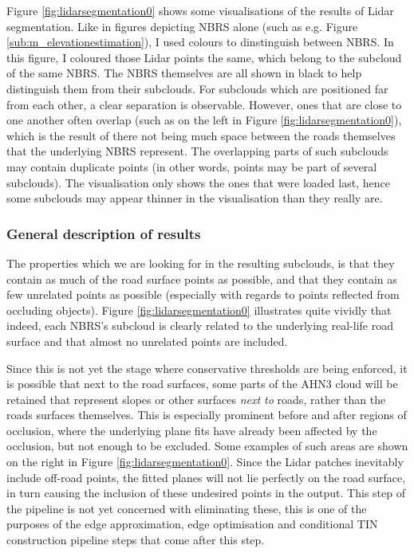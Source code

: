Figure \ref{fig:lidarsegmentation0} shows some visualisations of the results of Lidar segmentation. Like in figures depicting NBRS alone (such as e.g. Figure \ref{sub:m_elevationestimation}), I used colours to dinstinguish between NBRS. In this figure, I coloured those Lidar points the same, which belong to the subcloud of the same NBRS. The NBRS themselves are all shown in black to help distinguish them from their subclouds. For subclouds which are positioned far from each other, a clear separation is observable. However, ones that are close to one another often overlap (such as on the left in Figure \ref{fig:lidarsegmentation0}), which is the result of there not being much space between the roads themselves that the underlying NBRS represent. The overlapping parts of such subclouds may contain duplicate points (in other words, points may be part of several subclouds). The visualisation only shows the ones that were loaded last, hence some subclouds may appear thinner in the visualisation than they really are.

\subsubsection{General description of results}

The properties which we are looking for in the resulting subclouds, is that they contain as much of the road surface points as possible, and that they contain as few unrelated points as possible (especially with regards to points reflected from occluding objects). Figure \ref{fig:lidarsegmentation0} illustrates quite vividly that indeed, each NBRS's subcloud is clearly related to the underlying real-life road surface and that almost no unrelated points are included.

Since this is not yet the stage where conservative thresholds are being enforced, it is possible that next to the road surfaces, some parts of the AHN3 cloud will be retained that represent slopes or other surfaces \textit{next to} roads, rather than the roads surfaces themselves. This is especially prominent before and after regions of occlusion, where the underlying plane fits have already been affected by the occlusion, but not enough to be excluded. Some examples of such areas are shown on the right in Figure \ref{fig:lidarsegmentation0}. Since the Lidar patches inevitably include off-road points, the fitted planes will not lie perfectly on the road surface, in turn causing the inclusion of these undesired points in the output. This step of the pipeline is not yet concerned with eliminating these, this is one of the purposes of the edge approximation, edge optimisation and conditional TIN construction pipeline steps that come after this step.

